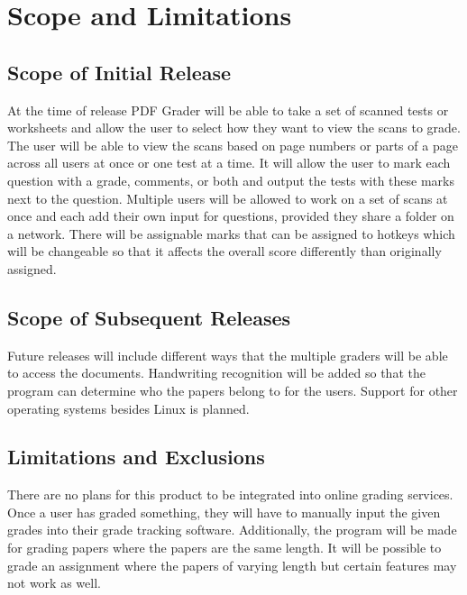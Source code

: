 \section{Scope and Limitations}
%
\subsection{Scope of Initial Release}
At the time of release PDF Grader will be able to take a set of scanned tests or worksheets and allow the user to select how they want to view the scans to grade. The user will be able to view the scans based on page numbers or parts of a page across all users at once or one test at a time. It will allow the user to mark each question with a grade, comments, or both and output the tests with these marks next to the question. Multiple users will be allowed to work on a set of scans at once and each add their own input for questions, provided they share a folder on a network. There will be assignable marks that can be assigned to hotkeys which will be changeable so that it affects the overall score differently than originally assigned.
\subsection{Scope of Subsequent Releases}
    Future releases will include different ways that the multiple graders will be able to access the documents. Handwriting recognition will be added so that the program can determine who the papers belong to for the users. Support for other operating systems besides Linux is planned.
\subsection{Limitations and Exclusions}
 There are no plans for this product to be integrated into online grading services. Once a user has graded something, they will have to manually input the given grades into their grade tracking software. Additionally, the program will be made for grading papers where the papers are the same length. It will be possible to grade an assignment where the papers of varying length but certain features may not work as well.
